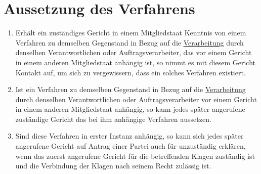 \chapter{Aussetzung des Verfahrens}
\label{ch:81}


\begin{enumerate}

  \item Erhält ein zuständiges Gericht in einem Mitgliedstaat Kenntnis von einem Verfahren zu demselben Gegenstand in
   Bezug auf die \hyperref[itm:04-2]{Verarbeitung} durch denselben Verantwortlichen oder Auftragsverarbeiter, das vor einem Gericht in einem
   anderen Mitgliedstaat anhängig ist, so nimmt es mit diesem Gericht Kontakt auf, um sich zu vergewissern, dass ein
   solches Verfahren existiert.
  \label{itm:81-1}

  \item Ist ein Verfahren zu demselben Gegenstand in Bezug auf die \hyperref[itm:04-2]{Verarbeitung} durch denselben Verantwortlichen oder
   Auftragsverarbeiter vor einem Gericht in einem anderen Mitgliedstaat anhängig, so kann jedes später angerufene
   zuständige Gericht das bei ihm anhängige Verfahren aussetzen.
  \label{itm:81-2}

  \item Sind diese Verfahren in erster Instanz anhängig, so kann sich jedes später angerufene Gericht auf Antrag einer
   Partei auch für unzuständig erklären, wenn das zuerst angerufene Gericht für die betreffenden Klagen zuständig ist
   und die Verbindung der Klagen nach seinem Recht zulässig ist.
  \label{itm:81-3}

\end{enumerate}


